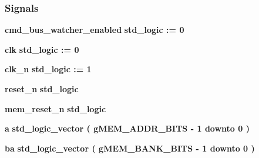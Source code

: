 \subsubsection*{Signals}
 \begin{DoxyCompactItemize}
\item 
{\bf cmd\+\_\+bus\+\_\+watcher\+\_\+enabled} {\bfseries \textcolor{comment}{std\+\_\+logic}\textcolor{vhdlchar}{ }\textcolor{vhdlchar}{ }\textcolor{vhdlchar}{\+:}\textcolor{vhdlchar}{=}\textcolor{vhdlchar}{ }\textcolor{vhdlchar}{ }\textcolor{vhdlchar}{\textquotesingle{}}\textcolor{vhdlchar}{ } \textcolor{vhdldigit}{0} \textcolor{vhdlchar}{ }\textcolor{vhdlchar}{\textquotesingle{}}\textcolor{vhdlchar}{ }} 
\item 
{\bf clk} {\bfseries \textcolor{comment}{std\+\_\+logic}\textcolor{vhdlchar}{ }\textcolor{vhdlchar}{ }\textcolor{vhdlchar}{\+:}\textcolor{vhdlchar}{=}\textcolor{vhdlchar}{ }\textcolor{vhdlchar}{ }\textcolor{vhdlchar}{\textquotesingle{}}\textcolor{vhdlchar}{ } \textcolor{vhdldigit}{0} \textcolor{vhdlchar}{ }\textcolor{vhdlchar}{\textquotesingle{}}\textcolor{vhdlchar}{ }} 
\item 
{\bf clk\+\_\+n} {\bfseries \textcolor{comment}{std\+\_\+logic}\textcolor{vhdlchar}{ }\textcolor{vhdlchar}{ }\textcolor{vhdlchar}{\+:}\textcolor{vhdlchar}{=}\textcolor{vhdlchar}{ }\textcolor{vhdlchar}{ }\textcolor{vhdlchar}{\textquotesingle{}}\textcolor{vhdlchar}{ } \textcolor{vhdldigit}{1} \textcolor{vhdlchar}{ }\textcolor{vhdlchar}{\textquotesingle{}}\textcolor{vhdlchar}{ }} 
\item 
{\bf reset\+\_\+n} {\bfseries \textcolor{comment}{std\+\_\+logic}\textcolor{vhdlchar}{ }} 
\item 
{\bf mem\+\_\+reset\+\_\+n} {\bfseries \textcolor{comment}{std\+\_\+logic}\textcolor{vhdlchar}{ }} 
\item 
{\bf a} {\bfseries \textcolor{comment}{std\+\_\+logic\+\_\+vector}\textcolor{vhdlchar}{ }\textcolor{vhdlchar}{(}\textcolor{vhdlchar}{ }\textcolor{vhdlchar}{ }\textcolor{vhdlchar}{ }\textcolor{vhdlchar}{ }{\bfseries {\bf g\+M\+E\+M\+\_\+\+A\+D\+D\+R\+\_\+\+B\+I\+TS}} \textcolor{vhdlchar}{-\/}\textcolor{vhdlchar}{ } \textcolor{vhdldigit}{1} \textcolor{vhdlchar}{ }\textcolor{keywordflow}{downto}\textcolor{vhdlchar}{ }\textcolor{vhdlchar}{ } \textcolor{vhdldigit}{0} \textcolor{vhdlchar}{ }\textcolor{vhdlchar}{)}\textcolor{vhdlchar}{ }} 
\item 
{\bf ba} {\bfseries \textcolor{comment}{std\+\_\+logic\+\_\+vector}\textcolor{vhdlchar}{ }\textcolor{vhdlchar}{(}\textcolor{vhdlchar}{ }\textcolor{vhdlchar}{ }\textcolor{vhdlchar}{ }\textcolor{vhdlchar}{ }{\bfseries {\bf g\+M\+E\+M\+\_\+\+B\+A\+N\+K\+\_\+\+B\+I\+TS}} \textcolor{vhdlchar}{-\/}\textcolor{vhdlchar}{ } \textcolor{vhdldigit}{1} \textcolor{vhdlchar}{ }\textcolor{keywordflow}{downto}\textcolor{vhdlchar}{ }\textcolor{vhdlchar}{ } \textcolor{vhdldigit}{0} \textcolor{vhdlchar}{ }\textcolor{vhdlchar}{)}\textcolor{vhdlchar}{ }} 

\end{DoxyCompactItemize}
